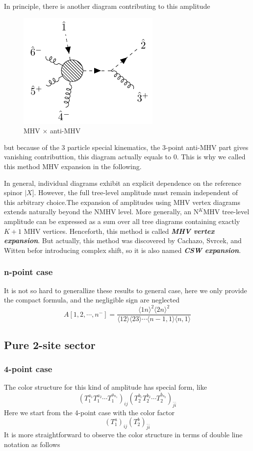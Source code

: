 \documentclass[12pt]{article}
\numberwithin{equation}{section}
\newcommand{\mdavg}[2]{\langle #1 \rangle\!\langle #2 \rangle}
\newcommand{\avg}[1]{\langle #1 \rangle}
\newcommand{\sket}[1]{|#1]}
\newcommand{\tif}[1]{\textit{\textbf{#1}}}
\begin{document}
In principle, there is another diagram contributing to this amplitude
\begin{figure}[H]
    \centering
    \includegraphics{sqcd6.pdf}
    \caption{MHV $\times$ anti-MHV}
\end{figure}
but because of the 3 particle special kinematics, the 3-point anti-MHV part gives vanishing contributtion, this diagram actually equals to 0. This is why we called this method MHV expansion in the following.

In general, individual diagrams exhibit an explicit dependence on the reference spinor $\sket{X}$. However, the full tree-level amplitude must remain independent of this arbitrary choice.The expansion of amplitudes using MHV vertex diagrams extends naturally beyond the NMHV level. More generally, an N$^K$MHV tree-level amplitude can be expressed as a sum over all tree diagrams containing exactly $K + 1$ MHV vertices.
Henceforth, this method is called \tif{MHV vertex expansion}. But actually, this method was discovered by Cachazo, Svrcek, and Witten \cite{Cachazo:2004kj} befor introducing complex shift, so it is also named \tif{CSW expansion}. 
\subsubsection{n-point case}
It is not so hard to generallize these results to general case, here we only provide the compact formula, and the negligible sign are neglected
\begin{equation*}
    A[1,2,\cdots,n^-]=\frac{\avg{1n}^2\avg{2n}^2}{\mdavg{12}{23}\cdots\mdavg{n-1,1}{n,1}}
\end{equation*} 
\subsection{Pure 2-site sector}
\subsubsection{4-point case}
The color structure for this kind of amplitude has special form, like
\begin{equation}
    (T_1^{a_1}T_1^{a_2}\cdots T_1^{a_{n_1}})_{ij}(T_2^{b_1}T_2^{b_2}\cdots T_2^{b_{n_2}})_{\bar{j}\bar{i}}
\end{equation}
Here we start from the 4-point case with the color factor
\begin{equation}
    (T_1^a)_{ij}(T_2^b)_{\bar{j}\bar{i}}
\end{equation}
It is more straightforward to observe the color structure in terms of double line notation as follows 
\vspace{0.5em}
\end{document}
